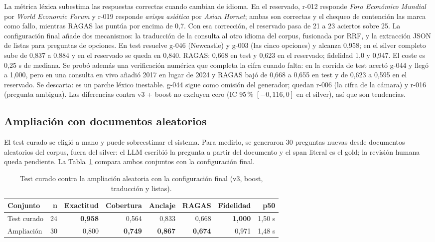 La m\'etrica l\'exica subestima las respuestas correctas cuando cambian de idioma. En el reservado, r-012 responde \textit{Foro Econ\'omico Mundial} por \textit{World Economic Forum} y r-019 responde \textit{avispa asi\'atica} por \textit{Asian Hornet}; ambas son correctas y el chequeo de contenci\'on las marca como fallo, mientras RAGAS las punt\'ua por encima de 0,7. Con esa correcci\'on, el reservado pasa de 21 a 23 aciertos sobre 25. La configuraci\'on final a\~nade dos mecanismos: la traducci\'on de la consulta al otro idioma del corpus, fusionada por RRF, y la extracci\'on JSON de listas para preguntas de opciones. En test resuelve g-046 (Newcastle) y g-003 (las cinco opciones) y alcanza 0,958; en el silver completo sube de 0,837 a 0,884 y en el reservado se queda en 0,840. RAGAS: 0,668 en test y 0,623 en el reservado; fidelidad 1,0 y 0,947. El coste es 0,25 s de mediana. Se prob\'o adem\'as una verificaci\'on num\'erica que completa la cifra cuando falta: en la corrida de test acert\'o g-044 y lleg\'o a 1,000, pero en una consulta en vivo a\~nadi\'o 2017 en lugar de 2024 y RAGAS baj\'o de 0,668 a 0,655 en test y de 0,623 a 0,595 en el reservado. Se descarta: es un parche l\'exico inestable. g-044 sigue como omisi\'on del generador; quedan r-006 (la cifra de la c\'amara) y r-016 (pregunta ambigua). Las diferencias contra v3 + boost no excluyen cero (IC 95\,\% $[-0{,}116, 0]$ en el silver), as\'i que son tendencias.

\subsection{Ampliaci\'on con documentos aleatorios}
\label{sec:ampliacion}

El test curado se eligi\'o a mano y puede sobreestimar el sistema. Para medirlo, se generaron 30 preguntas nuevas desde documentos aleatorios del corpus, fuera del silver: el LLM escribi\'o la pregunta a partir del documento y el span literal es el gold; la revisi\'on humana queda pendiente. La Tabla~\ref{tab:ampliacion} compara ambos conjuntos con la configuraci\'on final.

\begin{table}[t]
\centering
\footnotesize
\caption{Test curado contra la ampliaci\'on aleatoria con la configuraci\'on final (v3, boost, traducci\'on y listas).}
\label{tab:ampliacion}
\begin{tabular}{lrrrrrrr}
\toprule
Conjunto & n & Exactitud & Cobertura & Anclaje & RAGAS & Fidelidad & p50 \\
\midrule
Test curado & 24 & \textbf{0,958} & 0,564 & 0,833 & 0,668 & \textbf{1,000} & 1,50 s \\
Ampliaci\'on & 30 & 0,800 & \textbf{0,749} & \textbf{0,867} & \textbf{0,674} & 0,971 & 1,48 s \\
\bottomrule
\end{tabular}
\end{table}

